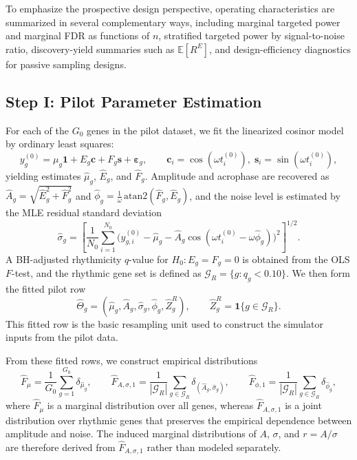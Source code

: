 \documentclass{article}
\begin{document}
To emphasize the prospective design perspective, operating characteristics are
summarized in several complementary ways, including marginal targeted power and
marginal FDR as functions of $n$, stratified targeted power by signal-to-noise
ratio, discovery-yield summaries such as $\mathbb{E}[R^E]$, and
design-efficiency diagnostics for passive sampling designs.

\subsection{Step I: Pilot Parameter Estimation}
\label{sec:pilot}

For each of the $G_0$ genes in the pilot dataset, we fit the linearized cosinor
model by ordinary least squares:
\begin{equation}
y_g^{(0)}=\mu_g\mathbf{1}+E_g\mathbf{c}+F_g\mathbf{s}+\boldsymbol\varepsilon_g,
\qquad
\mathbf{c}_i=\cos(\omega t_i^{(0)}),\;\mathbf{s}_i=\sin(\omega t_i^{(0)}),
\label{eq:pilot_fit}
\end{equation}
yielding estimates $\hat{\mu}_g$, $\hat{E}_g$, and $\hat{F}_g$.
Amplitude and acrophase are recovered as
\(\hat{A}_g=\sqrt{\hat{E}_g^2+\hat{F}_g^2}\) and
\(\hat{\phi}_g=\frac{1}{\omega}\,\mathrm{atan2}\!\left(\hat{F}_g,\hat{E}_g\right)\),
and the noise level is estimated by the MLE residual standard deviation
\begin{equation}
\hat{\sigma}_g
=
\left[
\frac{1}{N_0}\sum_{i=1}^{N_0}
\bigl(
y_{g,i}^{(0)}-\hat{\mu}_g-\hat{A}_g\cos(\omega t_i^{(0)}-\omega\hat{\phi}_g)
\bigr)^2
\right]^{1/2}.
\label{eq:pilot_sigma}
\end{equation}
A BH-adjusted rhythmicity $q$-value for $H_0:E_g=F_g=0$ is obtained from the
OLS $F$-test, and the rhythmic gene set is defined as
$\mathcal{G}_R=\{g:q_g<0.10\}$. We then form the fitted pilot row
\[
\hat{\Theta}_g=(\hat{\mu}_g,\hat{A}_g,\hat{\sigma}_g,\hat{\phi}_g,\hat{Z}_g^R),
\qquad
\hat{Z}_g^R=\mathbf{1}\{g\in\mathcal{G}_R\}.
\]
This fitted row is the basic resampling unit used to construct the simulator
inputs from the pilot data.

From these fitted rows, we construct empirical distributions
\begin{equation}
\hat{F}_\mu=\frac{1}{G_0}\sum_{g=1}^{G_0}\delta_{\hat{\mu}_g},
\qquad
\hat{F}_{A,\sigma,1}
=
\frac{1}{|\mathcal{G}_R|}\sum_{g\in\mathcal{G}_R}
\delta_{(\hat{A}_g,\hat{\sigma}_g)},
\qquad
\hat{F}_{\phi,1}
=
\frac{1}{|\mathcal{G}_R|}\sum_{g\in\mathcal{G}_R}\delta_{\hat{\phi}_g},
\label{eq:empirical_dists}
\end{equation}
where $\hat{F}_\mu$ is a marginal distribution over all genes, whereas
$\hat{F}_{A,\sigma,1}$ is a joint distribution over rhythmic genes that
preserves the empirical dependence between amplitude and noise. The induced
marginal distributions of $A$, $\sigma$, and $r=A/\sigma$ are therefore derived
from $\hat{F}_{A,\sigma,1}$ rather than modeled separately.
\end{document}
